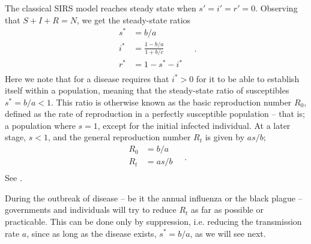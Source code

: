\documentclass[]{article}
\begin{document}
The classical SIRS model reaches steady state when $s'=i'=r'=0$. Observing that $S + I + R = N$, we get the steady-state ratios
\begin{equation} \label{eq:sirs-classic-steady}
\begin{aligned}
	s^* &= b/a \\
	i^* &= \frac{1 - b/a}{1 + b/c} \\
	r^* &= 1 - s^* - i^* \\
\end{aligned} \quad .
\end{equation}
Here we note that for a disease requires that $i^* > 0$ for it to be able to establish itself within a population, meaning that the steady-state ratio of susceptibles $s^* = b/a < 1$. This ratio is otherwise known as the basic reproduction number $R_0$, defined as the rate of reproduction in a perfectly susceptible population -- that is; a population where $s = 1$, except for the initial infected individual. At a later stage, $s < 1$, and the general reproduction number $R_t$ is given by $as/b$;
\begin{equation} \label{eq:reproduction-numbers}
\begin{aligned}
	R_0 &= b/a \\
	R_t &= as/b \\
\end{aligned} \quad .
\end{equation}
See \cite{milligan2015}.

During the outbreak of disease -- be it the annual influenza or the black plague -- governments and individuals will try to reduce $R_t$ as far as possible or practicable. This can be done only by suppression, i.e. reducing the transmission rate $a$, since as long as the disease exists, $s^* = b/a$, as we will see next. 
\end{document}
